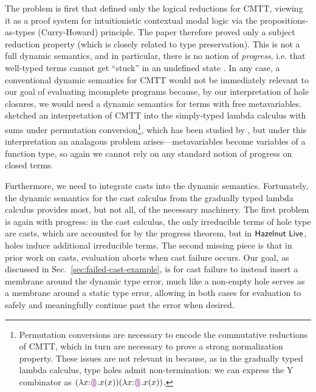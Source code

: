 The problem is first that \citet{Nanevski2008} defined only the logical reductions for CMTT, viewing it as a proof system for intuitionistic contextual modal logic via the propositions-as-types (Curry-Howard) principle. The paper therefore proved only a subject reduction property (which is closely related to type preservation). This is not a full dynamic semantics, and in particular, there is no notion of \emph{progress}, i.e. that well-typed terms cannot get ``stuck'' in an undefined state \cite{wright94:_type_soundness}. In any case, a conventional dynamic semantics for CMTT would not be immediately relevant to our goal of evaluating incomplete programs because, by our interpretation of hole closures, we would need a dynamic semantics for terms with free metavariables. \citet{Nanevski2008} sketched an interpretation of CMTT into the simply-typed lambda calculus with sums under permutation conversion\footnote{Permutation conversions are necessary to encode the commutative reductions of CMTT, which in turn are necessary to prove a strong normalization property. These issues are not relevant in \HazelnutLive because, as in the gradually typed lambda calculus, type holes admit non-termination: we can express the Y combinator as $(\lambda x{:}\textcolor{violet}{\llparenthesis}\textcolor{violet}{\rrparenthesis}.x(x)) (\lambda x{:}\textcolor{violet}{\llparenthesis}\textcolor{violet}{\rrparenthesis}.x(x))$.}, which has been studied by \citet{DBLP:journals/iandc/Groote02}, but under this interpretation an analagous problem arises---metavariables become variables of a function type, so again we cannot rely on any standard notion of progress on closed terms.%

Furthermore, we need to integrate casts into the dynamic semantics. Fortunately, the dynamic semantics for the cast calculus from the gradually typed lambda calculus provides most, but not all, of the necessary machinery. The first problem is again with progress: in the cast calculus, the only irreducible terms of hole type are casts, which are accounted for by the progress theorem, but in $\textsf{Hazelnut Live}$, holes induce additional irreducible terms. The second missing piece is that in prior work on casts, evaluation aborts when cast failure occurs. Our goal, as discussed in Sec.~\ref{sec:failed-cast-example}, is for cast failure to instead insert a membrane around the dynamic type error, much like a non-empty hole serves as a membrane around a static type error, allowing in both cases for evaluation to safely and meaningfully continue past the error when desired.

